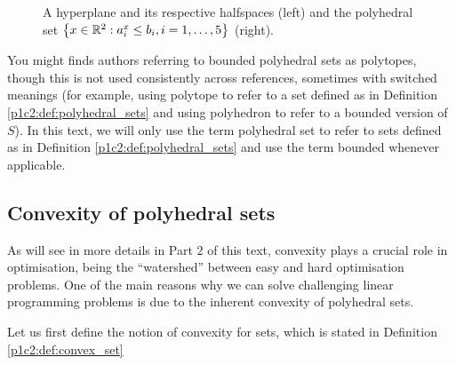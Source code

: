 \begin{figure}[h]
			\vspace{1pt}
		\caption{A hyperplane and its respective halfspaces (left) and the polyhedral set $\left\{ x\in \mathbb{R}^{2} : a_i^x \leq b_i, i =1,\dots, 5 \right \}$ (right).} \label{p1c2:fig:hyperplanes_and_polyhedral_set}		
	\end{figure}

You might finds authors referring to bounded polyhedral sets as polytopes, though this is not used consistently across references, sometimes with switched meanings (for example, using polytope to refer to a set defined as in Definition \ref{p1c2:def:polyhedral_sets} and using polyhedron to refer to a bounded version of $S$). In this text, we will only use the term polyhedral set to refer to sets defined as in Definition \ref{p1c2:def:polyhedral_sets} and use the term bounded whenever applicable.



\subsection{Convexity of polyhedral sets}

As will see in more details in Part 2 of this text, convexity plays a crucial role in optimisation, being the ``watershed'' between easy and hard optimisation problems. One of the main reasons why we can solve challenging linear programming problems is due to the inherent convexity of polyhedral sets.

Let us first define the notion of convexity for sets, which is stated in Definition \ref{p1c2:def:convex_set} 

